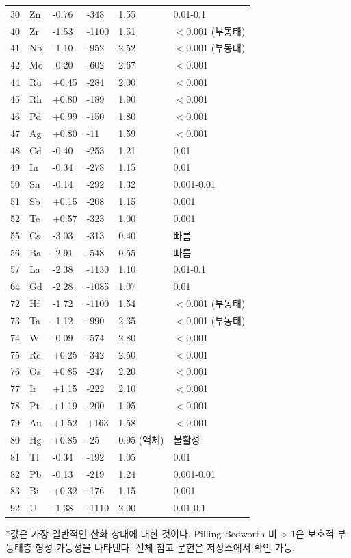\documentclass[12pt,a4paper]{article}
\begin{document}
\begin{longtable}{p{0.8cm}p{1.2cm}p{2.5cm}p{2.5cm}p{2.5cm}p{2.5cm}}
		30 & Zn & -0.76 & -348 & 1.55 & 0.01-0.1 \\
		40 & Zr & -1.53 & -1100 & 1.51 & $<$0.001 (부동태) \\
		41 & Nb & -1.10 & -952 & 2.52 & $<$0.001 (부동태) \\
		42 & Mo & -0.20 & -602 & 2.67 & $<$0.001 \\
		44 & Ru & +0.45 & -284 & 2.00 & $<$0.001 \\
		45 & Rh & +0.80 & -189 & 1.90 & $<$0.001 \\
		46 & Pd & +0.99 & -150 & 1.80 & $<$0.001 \\
		47 & Ag & +0.80 & -11 & 1.59 & $<$0.001 \\
		48 & Cd & -0.40 & -253 & 1.21 & 0.01 \\
		49 & In & -0.34 & -278 & 1.15 & 0.01 \\
		50 & Sn & -0.14 & -292 & 1.32 & 0.001-0.01 \\
		51 & Sb & +0.15 & -208 & 1.15 & 0.001 \\
		52 & Te & +0.57 & -323 & 1.00 & 0.001 \\
		55 & Cs & -3.03 & -313 & 0.40 & 빠름 \\
		56 & Ba & -2.91 & -548 & 0.55 & 빠름 \\
		57 & La & -2.38 & -1130 & 1.10 & 0.01-0.1 \\
		64 & Gd & -2.28 & -1085 & 1.07 & 0.01 \\
		72 & Hf & -1.72 & -1100 & 1.54 & $<$0.001 (부동태) \\
		73 & Ta & -1.12 & -990 & 2.35 & $<$0.001 (부동태) \\
		74 & W  & -0.09 & -574 & 2.80 & $<$0.001 \\
		75 & Re & +0.25 & -342 & 2.50 & $<$0.001 \\
		76 & Os & +0.85 & -247 & 2.20 & $<$0.001 \\
		77 & Ir & +1.15 & -222 & 2.10 & $<$0.001 \\
		78 & Pt & +1.19 & -200 & 1.95 & $<$0.001 \\
		79 & Au & +1.52 & +163 & 1.58 & $<$0.001 \\
		80 & Hg & +0.85 & -25 & 0.95 (액체) & 불활성 \\
		81 & Tl & -0.34 & -192 & 1.05 & 0.01 \\
		82 & Pb & -0.13 & -219 & 1.24 & 0.001-0.01 \\
		83 & Bi & +0.32 & -176 & 1.15 & 0.001 \\
		92 & U  & -1.38 & -1110 & 2.00 & 0.01-0.1 \\
		\bottomrule
	\end{longtable}
	*값은 가장 일반적인 산화 상태에 대한 것이다. Pilling-Bedworth 비 > 1은 보호적 부동태층 형성 가능성을 나타낸다. 전체 참고 문헌은 저장소에서 확인 가능.
	
\end{document}
